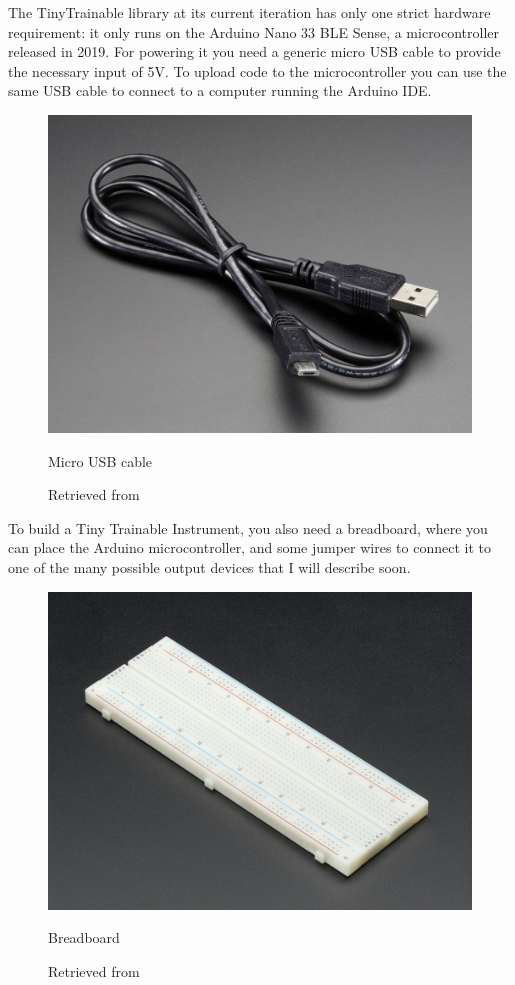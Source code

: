The TinyTrainable library at its current iteration has only one strict hardware requirement: it only runs on the Arduino Nano 33 \acrshort{BLE} Sense, a microcontroller released in 2019. For powering it you need a generic micro USB cable to provide the necessary input of 5V. To upload code to the microcontroller you can use the same USB cable to connect to a computer running the Arduino IDE.

\begin{figure}[ht]
  \centering
  \includegraphics[width=0.75\linewidth,height=0.25\textheight,keepaspectratio]{images/materials-adafruit-micro-usb-cable.jpg}
  \caption{Micro USB cable}
  \caption*{Retrieved from \cite{website-materials-adafruit-micro-usb-cable}}
  \label{fig:materials-adafruit-usb-cable}
\end{figure}

To build a Tiny Trainable Instrument, you also need a breadboard, where you can place the Arduino microcontroller, and some jumper wires to connect it to one of the many possible output devices that I will describe soon.

\begin{figure}[ht]
  \centering
  \includegraphics[width=0.75\linewidth,height=0.25\textheight,keepaspectratio]{images/materials-adafruit-breadboard.jpg}
  \caption{Breadboard}
  \caption*{Retrieved from \cite{website-materials-adafruit-breadboard}}
  \label{fig:materials-adafruit-breadboard}
\end{figure}

